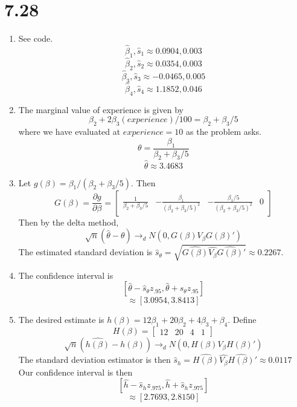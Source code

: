 \documentclass[10pt,letter]{article}
\begin{document}
\section*{7.28}
\begin{enumerate}[label=(\alph*)]
  \item See code.
  \[ \hat {\beta}_1, \hat{s}_1 \approx 0.0904, 0.003  \]
  \[ \hat{\beta}_2, \hat{s}_2 \approx 0.0354, 0.003  \]
  \[ \hat{\beta}_3, \hat{s}_3 \approx -0.0465, 0.005 \]
  \[ \hat{\beta}_4, \hat{s}_4 \approx 1.1852, 0.046 \]
  \item
  The marginal value of experience is given by
  \[ \beta_2 + 2\beta_3 (experience)/100  = \beta_2 + \beta_3/5 \]
  where we have evaluated at $experience = 10$ as the problem asks.
  \[ \theta = \frac{\beta_1}{\beta_2 + \beta_3/5} \]
  \[ \hat{\theta} \approx 3.4683 \]
  \item Let $g(\beta) = \beta_1 / (\beta_2 + \beta_3/5)$. Then
  \[ G(\beta) = \frac{\partial g}{\partial \beta} = \begin{bmatrix} \frac{1}{\beta_2 + \beta_3/5} & -\frac{\beta_1}{(\beta_2 + \beta_3/5)^2} & -\frac{\beta_1/5}{(\beta_2 + \beta_3/5)^2} & 0  \end{bmatrix}  \]
  Then by the delta method,
  \[ \sqrt{n}(\hat{\theta} - \theta) \to_d N(0, G(\beta)V_\beta G(\beta)') \]
  The estimated standard deviation is $\hat{s}_\theta = \sqrt{\widehat{G(\beta)}\widehat{V_\beta} \widehat{G(\beta)}'} \approx 0.2267$.
  \item The confidence interval is
  \[ \left[ \hat{\theta} - \hat{s}_\theta z_{.95} , \hat{\theta} + \hat{s}_\theta z_{.95}  \right] \]
  \[ \approx [3.0954, 3.8413] \]
  \item The desired estimate is $h(\beta) = 12\beta_1 + 20 \beta_2 + 4 \beta_3 + \beta_4$. Define
  \[ H(\beta) = \begin{bmatrix} 12 & 20 & 4 & 1\end{bmatrix} \]
  \[ \sqrt{n}(\widehat{h(\beta)} - h(\beta)) \to_d N(0, H(\beta)V_\beta H(\beta)')\]
  The standard deviation estimator is then $\hat{s}_h = \widehat{H(\beta)}\widehat{V_\beta}\widehat{H(\beta)}' \approx 0.0117$
  Our confidence interval is then
  \[ \left[ \hat{h} - \hat{s}_h z_{.975} , \hat{h} + \hat{s}_h z_{.975}  \right] \]
  \[ \approx [2.7693, 2.8150] \]
\end{enumerate}
\end{document}
